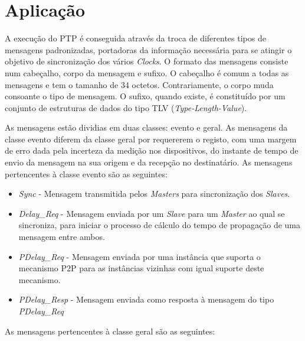 \section{Aplicação}
\label{section:theory1}


A execução do PTP é conseguida através da troca de diferentes tipos de mensagens padronizadas, portadoras da informação necessária para se atingir o objetivo de sincronização dos vários \textit{Clocks}. O formato das mensagens consiste num cabeçalho, corpo da mensagem e sufixo. O cabeçalho é comum a todas as mensagens e tem o tamanho de 34 octetos. Contrariamente, o corpo muda consoante o tipo de mensagem. O sufixo, quando existe, é constituído por um conjunto de estruturas de dados do tipo TLV (\textit{Type-Length-Value}).\par As mensagens estão dividias em duas classes: evento e geral. As mensagens da classe evento diferem da classe geral por requererem o registo, com uma margem de erro dada pela incerteza da medição nos dispositivos, do instante de tempo de envio da mensagem na sua origem e da recepção no destinatário. As mensagens pertencentes à classe evento são as seguintes:

\begin{itemize}
  \item \textit{Sync}  - \quad Mensagem transmitida pelos \textit{Masters} para sincronização dos \textit{Slaves}.
  \item \textit{Delay\_Req}  - \quad Mensagem enviada por um \textit{Slave} para um \textit{Master} ao qual se sincroniza, para iniciar o processo de cálculo do tempo de propagação de uma mensagem entre ambos. 
  \item \textit{PDelay\_Req}  - \quad Mensagem enviada por uma instância que suporta o mecanismo P2P para as instâncias vizinhas com igual suporte deste mecanismo.
  \item \textit{PDelay\_Resp} - \quad Mensagem enviada como resposta à mensagem do tipo \textit{PDelay\_Req} 
\end{itemize}


As mensagens pertencentes à classe geral são as seguintes:

